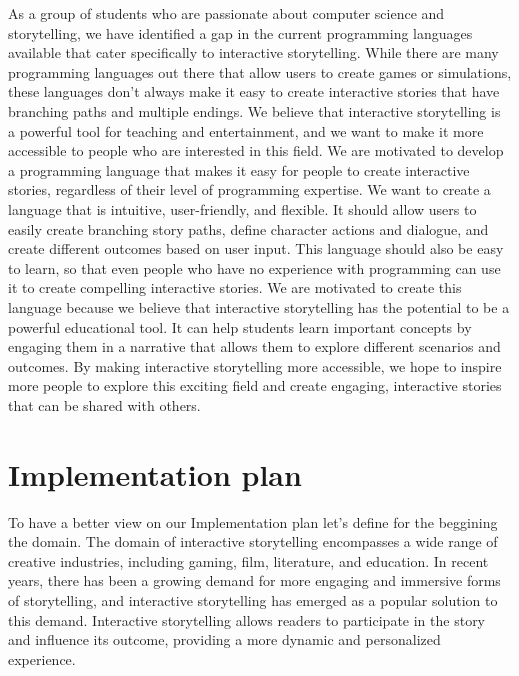 As a group of students who are passionate about computer science and storytelling, we have identified a gap in the current programming languages available that cater specifically to interactive storytelling. While there are many programming languages out there that allow users to create games or simulations, these languages don't always make it easy to create interactive stories that have branching paths and multiple endings.                                                    
We believe that interactive storytelling is a powerful tool for teaching and entertainment, and we want to make it more accessible to people who are interested in this field. We are motivated to develop a programming language that makes it easy for people to create interactive stories, regardless of their level of programming expertise.
We want to create a language that is intuitive, user-friendly, and flexible. It should allow users to easily create branching story paths, define character actions and dialogue, and create different outcomes based on user input. This language should also be easy to learn, so that even people who have no experience with programming can use it to create compelling interactive stories.
We are motivated to create this language because we believe that interactive storytelling has the potential to be a powerful educational tool. It can help students learn important concepts by engaging them in a narrative that allows them to explore different scenarios and outcomes. By making interactive storytelling more accessible, we hope to inspire more people to explore this exciting field and create engaging, interactive stories that can be shared with others.



\section{Implementation plan} To have a better view on our Implementation plan let's define for the beggining the domain.
The domain of interactive storytelling encompasses a wide range of creative industries, including gaming, film, literature, and education. In recent years, there has been a growing demand for more engaging and immersive forms of storytelling, and interactive storytelling has emerged as a popular solution to this demand. Interactive storytelling allows readers to participate in the story and influence its outcome, providing a more dynamic and personalized experience.



